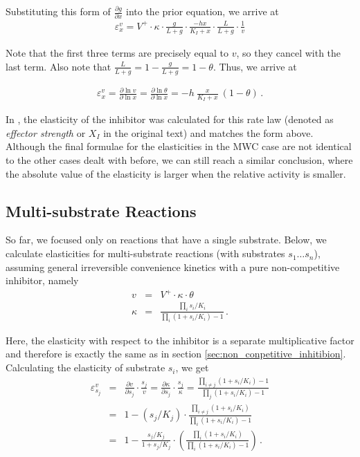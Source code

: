 \documentclass[12pt,a4paper]{article}
\begin{document}
Substituting this form of $\frac{\partial g}{\partial x}$ into the prior equation, we arrive at 
\begin{eqnarray}
\varepsilon_x^v = V^+ \cdot \kappa \cdot \frac{g}{L + g} \cdot \frac{-hx}{K_I + x} \cdot \frac{L}{L + g} \cdot \frac{1}{v}
\end{eqnarray}

\noindent Note that the first three terms are precisely equal to $v$, so they cancel with the last term. Also note that $\frac{L}{L + g} = 1 - \frac{g}{L + g} = 1 - \theta$. Thus, we arrive at

\begin{eqnarray}
\varepsilon_x^v = \frac{\partial \ln{v}}{\partial \ln{x}} = \frac{\partial \ln{\theta}}{\partial \ln{x}} = -h~\frac{x}{K_I + x} ~\left(1 - \theta \right)\,.
\end{eqnarray}

In \cite{Heinrich1974-yj}, the elasticity of the inhibitor was calculated for this rate law (denoted as \emph{effector strength} or $X_I$ in the original text) and matches the form above.
Although the final formulae for the elasticities in the MWC case are not identical to the other cases dealt with before, we can still reach a similar conclusion, where the absolute value of the elasticity is larger when the relative activity is smaller.

\subsection{Multi-substrate Reactions}
So far, we focused only on reactions that have a single substrate. Below, we calculate elasticities for multi-substrate reactions (with substrates $s_1 \ldots s_n$), assuming general irreversible convenience kinetics with a pure non-competitive inhibitor, namely
\begin{eqnarray}
v &=& V^+ \cdot \kappa \cdot \theta  \nonumber\\
\kappa &=& \frac{\prod_i s_i/K_i}{\prod_i (1 + s_i/K_i) - 1}\,.
\end{eqnarray}

Here, the elasticity with respect to the inhibitor is a separate multiplicative factor and therefore is exactly the same as in section \ref{sec:non_conpetitive_inhitibion}. Calculating the elasticity of substrate $s_i$, we get 
\begin{eqnarray}
\varepsilon^{v}_{s_j} &=& \frac{\partial v}{\partial s_j} \cdot \frac{s_j}{v}
 = \frac{\partial \kappa}{\partial s_j} \cdot \frac{s_j}{\kappa} 
 = \frac{\prod_{i \neq j}(1 + s_i/K_i) - 1}{\prod_j (1 + s_i/K_i) - 1} \nonumber\\
 &=& 1 - \left(s_j/K_j\right) \cdot \frac{\prod_{i \neq j} (1 + s_i/K_i)}{\prod_i (1 + s_i/K_i) - 1} \nonumber \\
 &=& 1 - \frac{ s_j/K_j}{1 +  s_j/K_j} \cdot \left(\frac{\prod_i (1 + s_i/K_i)}{\prod_i (1 + s_i/K_i) - 1}\right) 
 \,.
\end{eqnarray}
\end{document}
